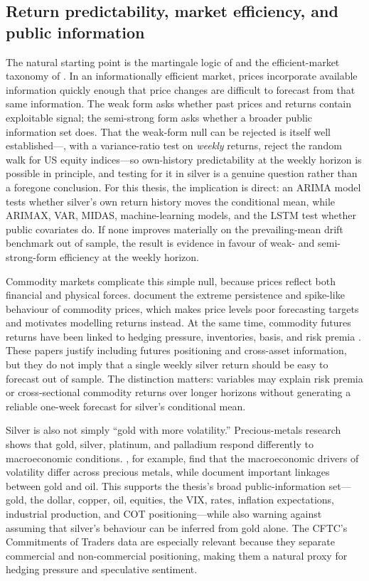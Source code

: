 \documentclass[12pt, a4paper]{article}
\begin{document}
\subsection{Return predictability, market efficiency, and public information}

The natural starting point is the martingale logic of \textcite{samuelson1965} and the
efficient-market taxonomy of \textcite{fama1970,fama1991}. In an informationally efficient
market, prices incorporate available information quickly enough that price changes are
difficult to forecast from that same information. The weak form asks whether past prices and
returns contain exploitable signal; the semi-strong form asks whether a broader public
information set does. That the weak-form null can be rejected is itself well
established---\textcite{lomackinlay1988}, with a variance-ratio test on \emph{weekly}
returns, reject the random walk for US equity indices---so own-history predictability at
the weekly horizon is possible in principle, and testing for it in silver is a genuine
question rather than a foregone conclusion. For this thesis, the implication is direct: an
ARIMA model tests
whether silver's own return history moves the conditional mean, while ARIMAX, VAR, MIDAS,
machine-learning models, and the LSTM test whether public covariates do. If none improves
materially on the prevailing-mean drift benchmark out of sample, the result is evidence in
favour of weak- and semi-strong-form efficiency at the weekly horizon.

Commodity markets complicate this simple null, because prices reflect both financial and
physical forces. \textcite{deaton1992} document the extreme persistence and spike-like
behaviour of commodity prices, which makes price levels poor forecasting targets and
motivates modelling returns instead. At the same time, commodity futures returns have been
linked to hedging pressure, inventories, basis, and risk premia
\parencite{bessembinder1992,gorton2006,gorton2013,szymanowska2014}. These papers justify
including futures positioning and cross-asset information, but they do not imply that a
single weekly silver return should be easy to forecast out of sample. The distinction
matters: variables may explain risk premia or cross-sectional commodity returns over longer
horizons without generating a reliable one-week forecast for silver's conditional mean.

Silver is also not simply ``gold with more volatility.'' Precious-metals research shows that
gold, silver, platinum, and palladium respond differently to macroeconomic conditions.
\textcite{batten2010}, for example, find that the macroeconomic drivers of volatility differ
across precious metals, while \textcite{zhang2010} document important linkages between gold
and oil. This supports the thesis's broad public-information set---gold, the dollar, copper,
oil, equities, the VIX, rates, inflation expectations, industrial production, and COT
positioning---while also warning against assuming that silver's behaviour can be inferred
from gold alone. The CFTC's Commitments of Traders data are especially relevant because they
separate commercial and non-commercial positioning, making them a natural proxy for hedging
pressure and speculative sentiment.
\end{document}
